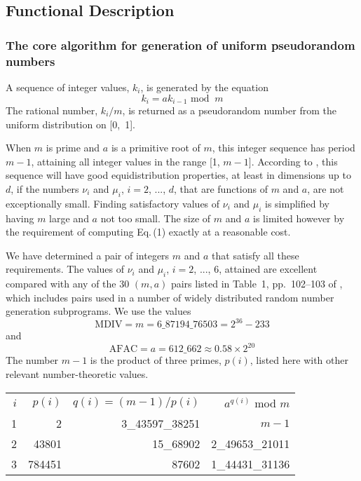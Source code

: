 \documentclass[twoside]{MATH77}
\begin{document}
\subsection{Functional Description}

\subsubsection{The core algorithm for generation of uniform pseudorandom
numbers}

A sequence of integer values, $k_i$, is generated by the equation
\begin{equation}
\label{O1}k_i = ak_{i-1}\text{ mod }\ m
\end{equation}
The rational number, $k_i/m$, is returned as a pseudorandom number from the
uniform distribution on [0,~1].

When $m$ is prime and $a$ is a primitive root of $m$, this integer
sequence has period $m-1$, attaining all integer values in the range [1,
$m-1]$.  According to \cite{Knuth:1981:ACP}, this sequence will have good
equidistribution properties, at least in dimensions up to $d$, if the
numbers $\nu _i$ and $\mu _i$, $i = 2$, ..., $d$, that are functions of
$m$ and $a$, are not exceptionally small.  Finding satisfactory values of
$\nu _i$ and $\mu _i$ is simplified by having $m$ large and $a$ not too
small.  The size of $m$ and $a$ is limited however by the requirement of
computing Eq.\,(1) exactly at a reasonable cost.

We have determined a pair of integers $m$ and $a$ that satisfy all these
requirements.  The values of $\nu _i$ and $\mu _i$, $i = 2$, ..., 6,
attained are excellent compared with any of the 30 $(m, a)$ pairs listed
in Table~1, pp.~102--103 of \cite{Knuth:1981:ACP}, which includes pairs
used in a number of widely distributed random number generation
subprograms.  We use the values $$ \text{MDIV} = m = 6\_87194\_76503 =
2^{36} - 233 $$ and $$ \text{AFAC} = a = 612\_662 \approx 0.58 \times
2^{20} $$ The number $m-1$ is the product of three primes, $p(i)$, listed
here with other relevant number-theoretic values.

\begin{tabular}{rrrr}
$i$ & $p(i)$ & $q(i) = (m-1)/p(i)$ & $a^{q(i)}$ mod $m$\\
1 & 2 & 3\_43597\_38251 & $m-1$\\
2 & 43801 & 15\_68902 & 2\_49653\_21011\\
3 & 784451 & 87602 & 1\_44431\_31136
\end{tabular}
\end{document}
